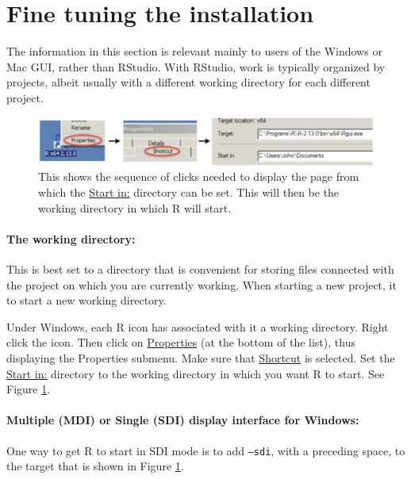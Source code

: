 



\section{Fine tuning the installation}\label{sec:fine-tune}
The information in this section is relevant mainly to users of the Windows
or Mac GUI, rather than RStudio.  With RStudio, work is typically
organized by projects, albeit usually with a different working
directory for each different project.

\begin{figure}
\includegraphics{figs-inc/16i-gui-prop.jpg}
\caption{This shows the sequence of clicks needed to display the
page from which the \underline{Start in:} directory can be set. This
will then be the working directory in which R will start.\label{fig:startin}}
\end{figure}

\paragraph{The working directory:}  This is best set to a directory that is
convenient for storing files connected with the project on which you are
currently working.  When starting a new project, it to start
a new working directory.

Under Windows, each R icon has associated with it a working directory.
  Right click the icon.  Then click on
\underline{Properties} (at the bottom of the list), thus displaying
the Properties submenu.  Make sure that \underline{Shortcut} is
selected.  Set the \underline{Start in:} directory to the working
directory in which you want R to start.  See Figure \ref{fig:startin}.

\paragraph{Multiple (MDI) or Single (SDI) display interface for Windows:}
One way to get R to start in SDI mode is to add \texttt{--sdi}, with a
preceding space, to the target that is shown in Figure
\ref{fig:startin}.

